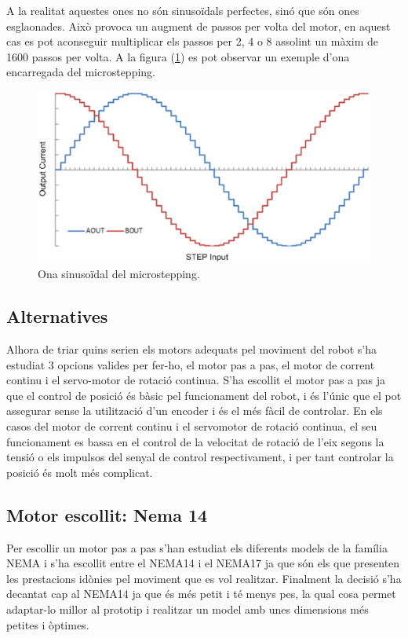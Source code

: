 A la realitat aquestes ones no són sinusoïdals perfectes, sinó que són ones esglaonades. Això provoca un augment de passos per volta del motor, en aquest cas es pot aconseguir multiplicar els passos per 2, 4 o 8 assolint un màxim de 1600 passos per volta. A la figura (\ref{fig:Microstepping}) es pot observar un exemple d’ona encarregada del microstepping. 

\begin{figure}[H]
	\centering
	\includegraphics[scale=0.5]{OnaMicrostepping.eps}
	\caption{Ona sinusoïdal del microstepping.}
	\label{fig:Microstepping}
\end{figure}

\subsection{Alternatives}
Alhora de triar quins serien els motors adequats pel moviment del robot s'ha estudiat 3 opcions valides per fer-ho, el motor pas a pas, el motor de corrent continu i el servo-motor de rotació continua. S'ha escollit el motor pas a pas ja que el control de posició és bàsic pel funcionament del robot, i és l'únic que el pot assegurar sense la utilització d'un encoder i és el més fàcil de controlar. En els casos del motor de corrent continu i el servomotor de rotació continua, el seu funcionament es bassa en el control de la velocitat de rotació de l'eix segons la tensió o els impulsos del senyal de control respectivament, i per tant controlar la posició és molt més complicat. 


\subsection{Motor escollit: Nema 14}
Per escollir un motor pas a pas s'han estudiat els diferents models de la família NEMA i s'ha escollit entre el NEMA14 i el NEMA17 ja que són els que presenten les prestacions idònies pel moviment que es vol realitzar. Finalment la decisió s'ha decantat cap al NEMA14 ja que és més petit i té menys pes, la qual cosa permet adaptar-lo millor al prototip i realitzar un model amb unes dimensions més petites i òptimes. 

